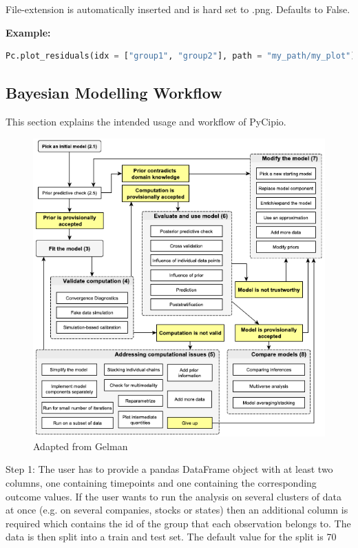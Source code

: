 \documentclass{article}
\begin{document}
\indent \indent \indent File-extension is automatically inserted and is hard set to .png. Defaults to False.

\indent \textbf{Example:}

\begin{lstlisting}[language=Python]
        Pc.plot_residuals(idx = ["group1", "group2"], path = "my_path/my_plot")
\end{lstlisting}

\subsection{Bayesian Modelling Workflow}

This section explains the intended usage and workflow of PyCipio. 

\begin{figure}[H]
    \centerline{\includegraphics[scale = 0.5]{images/Gelman.png}}
    \caption{Adapted from Gelman}
\end{figure}

Step 1: The user has to provide a pandas DataFrame object with at least two columns, one containing timepoints and one containing the corresponding outcome values. If the user wants to run the analysis on several clusters of data at once (e.g. on several companies, stocks or states) then an additional column is required which contains the id of the group that each observation belongs to. The data is then split into a train and test set. The default value for the split is 70%
\end{document}
